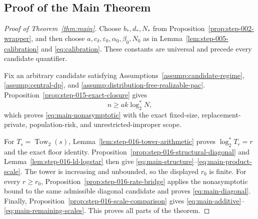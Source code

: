 \subsection{Proof of the Main Theorem}\label{app:main-proof}

\begin{proof}[Proof of Theorem~\ref{thm:main}]
Choose $b_*,d_*,N_*$ from
Proposition~\ref{prop:step-002-wrapper}, and then choose
$a,c_\delta,\varepsilon_0,\alpha_0,\beta_0,N_0$ as in
Lemma~\ref{lem:step-005-calibration} and \eqref{eq:calibration}.  These
constants are universal and precede every candidate quantifier.

Fix an arbitrary candidate satisfying
Assumptions~\ref{assump:candidate-regime},
\ref{assump:central-dp}, and
\ref{assump:distribution-free-realizable-pac}.  Proposition~\ref{prop:step-015-exact-closure}
gives
\[
n\ge ak\log_2^*N,
\]
which proves \eqref{eq:main-nonasymptotic} with the exact fixed-size,
replacement-private, population-risk, and unrestricted-improper scope.

For $T_s=\operatorname{Tow}_2(s)$, Lemma~\ref{lem:step-016-tower-arithmetic}
proves $\log_2^*T_r=r$ and the exact floor identity.
Proposition~\ref{prop:step-016-structural-diagonal} and
Lemma~\ref{lem:step-016-ld-logstar} then give
\eqref{eq:main-structure}--\eqref{eq:main-product-scale}.  The tower is
increasing and unbounded, so the displayed $r_0$ is finite.  For every
$r\ge r_0$, Proposition~\ref{prop:step-016-rate-bridge} applies the
nonasymptotic bound to the same admissible diagonal candidate and proves
\eqref{eq:main-diagonal}.  Finally,
Proposition~\ref{prop:step-016-scale-comparison} gives
\eqref{eq:main-additive}--\eqref{eq:main-remaining-scales}.  This proves all
parts of the theorem.
\end{proof}
